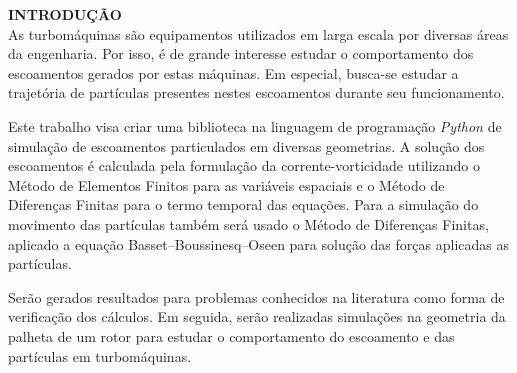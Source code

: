 \noindent\textbf{INTRODUÇÃO}
\\

As turbomáquinas são equipamentos utilizados em larga escala por diversas áreas da engenharia.
Por isso, é de grande interesse estudar o comportamento dos escoamentos gerados por estas máquinas.
Em especial, busca-se estudar a trajetória de partículas presentes nestes escoamentos durante seu funcionamento.

Este trabalho visa criar uma biblioteca na linguagem de programação \textit{Python} de simulação de escoamentos particulados em diversas geometrias.
A solução dos escoamentos é calculada pela formulação da corrente-vorticidade utilizando o Método de Elementos Finitos para as variáveis espaciais e o Método de Diferenças Finitas para o termo temporal das equações.
Para a simulação do movimento das partículas também será usado o Método de Diferenças Finitas, aplicado a equação Basset–Boussinesq–Oseen para solução das forças aplicadas as partículas.

Serão gerados resultados para problemas conhecidos na literatura como forma de verificação dos cálculos.
Em seguida, serão realizadas simulações na geometria da palheta de um rotor para estudar o comportamento do escoamento e das partículas em turbomáquinas.
